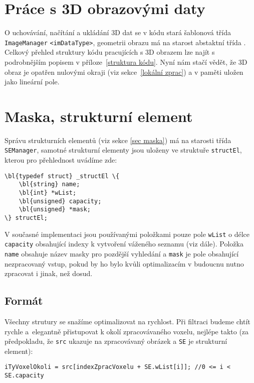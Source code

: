     \section{Práce s 3D obrazovými daty}

    O uchovávání, načítání a ukládání 3D dat se v kódu stará šablonová třída {\tt ImageManager} {\tt <imDataType>}, geometrii obrazu má na starost abstaktní třída \Imageinfo. Celkový přehled struktury kódu pracujících s 3D obrazem lze najít s podrobnějším popisem v příloze~\ref{struktura kódu}. Nyní nám stačí vědět, že 3D obraz je opatřen nulovými okraji (viz sekce~\ref{lokální zprac}) a v paměti uložen jako lineární pole.

    \section{Maska, strukturní element}

    Správu strukturních elementů (viz sekce \ref{sec maska}) má na starosti třída {\tt SEManager}, samotné strukturní elementy jsou uloženy ve struktuře {\tt structEl}, kterou pro přehlednost uvádíme zde:

    \begin{Verbatim}[commandchars = \\\{\}]
\bl{typedef struct} _structEl \{
    \bl{string} name; 
    \bl{int} *wList; 
    \bl{unsigned} capacity;
    \bl{unsigned} *mask;
\} structEl;
    \end{Verbatim}

    V současné implementaci jsou používanými položkami pouze pole {\tt wList} o délce {\tt capacity} obsahující indexy k vytvoření váženého seznamu (viz dále). Položka {\tt name} obsahuje název masky pro pozdější vyhledání a {\tt mask} je pole obsahující nezpracovaný vstup, pokud by ho bylo kvůli optimalizacím v budoucnu nutno zpracovat i jinak, než dosud.
    
    \subsection{Formát}

    Všechny strutury se snažíme optimalizovat na rychlost. Při filtraci budeme chtít rychle a~elegantně přistupovat k okolí zpracovávaného voxelu, nejlépe takto (za předpokladu, že {\tt src} ukazuje na zpracovávaný obrázek a {\tt SE} je strukturní element):

    \begin{Verbatim}
iTyVoxelOkoli = src[indexZpracVoxelu + SE.wList[i]]; //0 <= i < SE.capacity
    \end{Verbatim}

